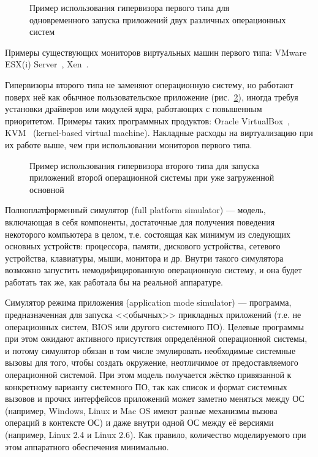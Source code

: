 \begin{description*}
\begin{figure}[htp]
\centering
{}
\caption[Гипервизор первого типа]{Пример использования гипервизора первого типа для одновременного запуска приложений двух различных операционных систем}\label{fig:vm-type1}
\end{figure}

Примеры существующих мониторов виртуальных машин первого типа: VMware ESX(i) Server~\cite{vmware-esx}, Xen~\cite{xen2006}.

\item[Гипервизоры второго типа] не заменяют операционную систему, но работают поверх неё как обычное пользовательское приложение (рис.~\ref{fig:vm-type2}), иногда требуя установки драйверов или модулей ядра, работающих с повышенным приоритетом. Примеры таких программных продуктов: Oracle VirtualBox~\cite{virtualbox}, KVM~\cite{kvm-wiki} (\abbr kernel-based virtual machine). Накладные расходы на виртуализацию при их работе выше, чем при использовании мониторов первого типа.

\begin{figure}[htp]
    \centering
    \caption[Гипервизор второго типа]{Пример использования гипервизора второго типа для запуска приложений второй операционной системы при уже загруженной основной}\label{fig:vm-type2}
\end{figure}

\item[Полноплатформенный симулятор] (\abbr full platform si\-mu\-la\-tor) --- модель, включающая в себя компоненты, достаточные для получения поведения некоторого компьютера в целом, т.е. состоящая как минимум из следующих основных устройств: процессора, памяти, дискового устройства, сетевого устройства, клавиатуры, мыши, монитора и др. Внутри такого симулятора возможно запустить немодифицированную операционную систему, и она будет работать так же, как работала бы на реальной аппаратуре.

\item[Симулятор режима приложения] (\abbr application mode si\-mu\-la\-tor) --- программа, предназначенная для запуска <<обычных>> прикладных приложений (т.е. не операционных систем, BIOS или другого системного ПО). Целевые программы при этом ожидают активного присутствия определённой операционной системы, и потому симулятор обязан в том числе эмулировать необходимые  системные вызовы для того, чтобы создать окружение, неотличимое от предоставляемого операционной системой. При этом модель получается жёстко привязанной к конкретному варианту системного ПО, так как список и формат системных вызовов и прочих интерфейсов приложений может заметно меняться между ОС (например, Windows, Linux и Mac OS имеют разные механизмы вызова операций в контексте ОС) и даже внутри одной ОС между её версиями (например, Linux 2.4 и Linux 2.6). Как правило, количество моделируемого при этом аппаратного обеспечения минимально.


\end{description*}
